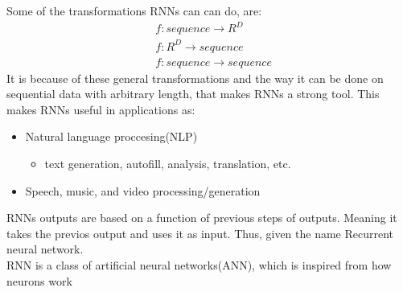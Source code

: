 \noindent
Some of the transformations RNNs can can do, are:
\begin{align*}
	&f:sequence \rightarrow R^D\\
	&f:R^D \rightarrow sequence\\
	&f:sequence \rightarrow sequence
\end{align*}
\noindent
It is because of these general transformations and the way it can be done on sequential data with arbitrary length, that makes RNNs a strong tool. This makes RNNs useful in applications as:
\begin{itemize}
    \item Natural language proccesing(NLP)
    \begin{itemize}
    	\item text generation, autofill, analysis, translation, etc.
    \end{itemize}
    \item Speech, music, and video processing/generation
\end{itemize}

\noindent
RNNs outputs are based on a function of previous steps of outputs. Meaning it takes the previos output and uses it as input. Thus, given the name Recurrent neural network.\\

\noindent
RNN is a class of artificial neural networks(ANN), which is inspired from how neurons work
